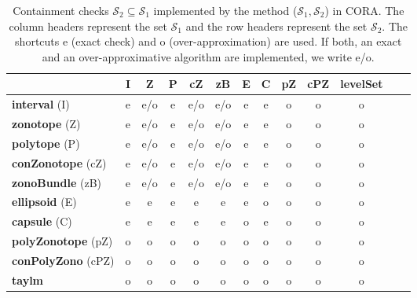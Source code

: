 \begin{table}[htb]
	\centering
	\footnotesize
	\caption{Containment checks $\mathcal{S}_2 \subseteq \mathcal{S}_1$ implemented by the method ($\mathcal{S}_1,\mathcal{S}_2$) in CORA. The column headers represent the set $\mathcal{S}_1$ and the row headers represent the set $\mathcal{S}_2$. The shortcuts e (exact check) and o (over-approximation) are used. If both, an exact and an over-approximative algorithm are implemented, we write e/o.}
	\label{tab:in}
	\begin{tabular}{ l c c c c c c c c c c c c}
		\toprule
					 & \textbf{I} & \textbf{Z} & \textbf{P} & \textbf{cZ} & \textbf{zB} & \textbf{E} & \textbf{C} & \textbf{pZ} & \textbf{cPZ} & \textbf{levelSet} \\
		\midrule
		\textbf{interval} (I)       		  & e & e/o & e & e/o & e/o & e	& e & o & o & o \\
		\textbf{zonotope} (Z)      		    & e & e/o & e & e/o & e/o & e	& e & o & o & o \\
		\textbf{polytope} (P)   	        & e & e/o & e & e/o & e/o & e	& e & o & o & o \\
		\textbf{conZonotope} (cZ)		      & e & e/o & e & e/o & e/o & e	& e & o & o & o \\
		\textbf{zonoBundle} (zB)  	      	  & e & e/o & e & e/o & e/o & e	& e & o & o & o \\
		\textbf{ellipsoid} (E)       	      & e & e   & e & e   & e   & e & o & o & o & o \\
		\textbf{capsule} (C)				  & e & e   & e & e   & e   & o	& e & o & o & o \\
		\textbf{polyZonotope} (pZ)		 	  & o & o   & o & o   & o   & o	& o & o & o & o \\
		\textbf{conPolyZono} (cPZ)			  & o & o   & o & o   & o   & o	& o & o & o & o \\
		\textbf{taylm}     	                  & o & o   & o & o   & o   & o	& o & o & o & o \\
		\bottomrule
	\end{tabular}
\end{table}




